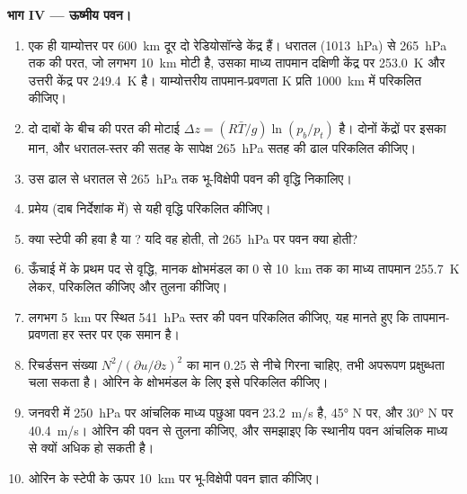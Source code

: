 \begin{problem}
\medskip\noindent\textbf{भाग IV --- ऊष्मीय पवन।}
\begin{enumerate}[resume]
\item एक ही याम्योत्तर पर \qty{600}{km} दूर दो रेडियोसॉन्डे केंद्र हैं।
  धरातल (\qty{1013}{hPa}) से \qty{265}{hPa} तक की परत, जो लगभग
  \qty{10}{km} मोटी है, उसका माध्य तापमान दक्षिणी केंद्र पर \qty{253.0}{K}
  और उत्तरी केंद्र पर \qty{249.4}{K} है। याम्योत्तरीय तापमान-प्रवणता
  \unit{K} प्रति \qty{1000}{km} में परिकलित कीजिए।
\item दो दाबों के बीच की परत की मोटाई $\Delta z = (R\bar
  T/g)\ln(p_b/p_t)$ है। दोनों केंद्रों पर इसका मान, और
  धरातल-स्तर की सतह के सापेक्ष \qty{265}{hPa} सतह की ढाल परिकलित कीजिए।
\item उस ढाल से धरातल से
  \qty{265}{hPa} तक भू-विक्षेपी पवन की वृद्धि निकालिए।
\item {} प्रमेय (दाब निर्देशांक में) से यही वृद्धि परिकलित कीजिए।
\item क्या स्टेपी की हवा  है या ? यदि वह  होती, तो
  \qty{265}{hPa} पर पवन क्या होती?
\item ऊँचाई में  के प्रथम पद से वृद्धि,
  मानक क्षोभमंडल का 0 से
  \qty{10}{km} तक का माध्य तापमान \qty{255.7}{K} लेकर, परिकलित कीजिए और तुलना कीजिए।
\item लगभग \qty{5}{km} पर स्थित \qty{541}{hPa} स्तर की पवन
  परिकलित कीजिए, यह मानते हुए कि तापमान-प्रवणता हर स्तर पर एक समान है।
\item रिचर्डसन संख्या $N^2/(\partial u/\partial z)^2$ का मान 0.25 से नीचे
  गिरना चाहिए, तभी अपरूपण प्रक्षुब्धता चला सकता है। ओरिन के क्षोभमंडल के लिए
  इसे परिकलित कीजिए।
\item जनवरी में \qty{250}{hPa} पर आंचलिक माध्य पछुआ पवन \qty{23.2}{m/s} है,
  \ang{45} N पर, और \ang{30} N पर \qty{40.4}{m/s}। ओरिन की पवन से तुलना कीजिए,
  और समझाइए कि स्थानीय पवन आंचलिक माध्य से क्यों अधिक हो सकती है।
\item ओरिन के स्टेपी के ऊपर \qty{10}{km} पर भू-विक्षेपी पवन ज्ञात कीजिए।
\end{enumerate}
\end{problem}
